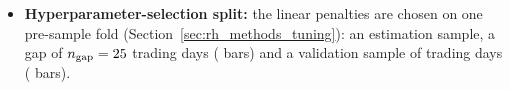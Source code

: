 \begin{itemize}
\item \textbf{Hyperparameter-selection split:} the linear penalties are chosen on one pre-sample fold
  (Section~\ref{sec:rh_methods_tuning}): an estimation sample, a gap of $n_{\mathrm{gap}} =
  25$ trading days (\rhdmPlPreEmbargoBars{} bars) and a validation sample of
  \rhdmPlPreFoldSess{} trading days (\rhdmPlPreFoldBars{} bars).

\end{itemize}
